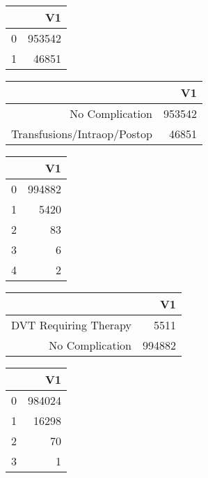 \bigskip\bigskip
\centering
\begin{tabular}{rr}
  \hline
 & V1 \\ 
  \hline
0 & 953542 \\ 
  1 & 46851 \\ 
   \hline
\end{tabular}

\bigskip\bigskip
\centering
\begin{tabular}{rr}
  \hline
 & V1 \\ 
  \hline
No Complication & 953542 \\ 
  Transfusions/Intraop/Postop & 46851 \\ 
   \hline
\end{tabular}

\bigskip\bigskip
\centering
\begin{tabular}{rr}
  \hline
 & V1 \\ 
  \hline
0 & 994882 \\ 
  1 & 5420 \\ 
  2 &  83 \\ 
  3 &   6 \\ 
  4 &   2 \\ 
   \hline
\end{tabular}

\bigskip\bigskip
\centering
\begin{tabular}{rr}
  \hline
 & V1 \\ 
  \hline
DVT Requiring Therapy & 5511 \\ 
  No Complication & 994882 \\ 
   \hline
\end{tabular}

\bigskip\bigskip
\centering
\begin{tabular}{rr}
  \hline
 & V1 \\ 
  \hline
0 & 984024 \\ 
  1 & 16298 \\ 
  2 &  70 \\ 
  3 &   1 \\ 
   \hline
\end{tabular}

